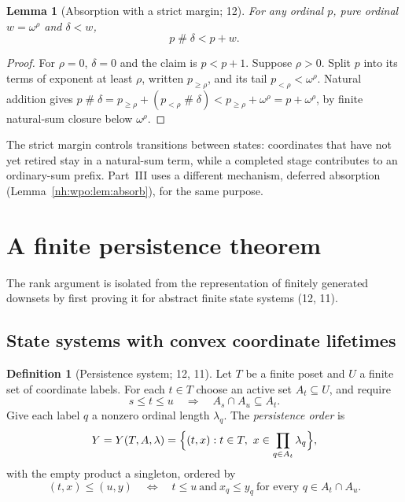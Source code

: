 \documentclass[11pt,a4paper]{article}
\newtheorem{lemma}[theorem]{Lemma}
\theoremstyle{definition}
\newtheorem{definition}[theorem]{Definition}
\theoremstyle{remark}
\newcommand{\ns}{\mathbin{\#}}
\begin{document}
\begin{lemma}[Absorption with a strict margin; 12]\label{nh:lem:absorb}
For any ordinal $p$, pure ordinal $w=\omega^\rho$ and $\delta<w$,
\begin{equation}\label{nh:eq:absorb}
 p\ns\delta<p+w.
\end{equation}
\end{lemma}
\begin{proof}
For $\rho=0$, $\delta=0$ and the claim is $p<p+1$. Suppose $\rho>0$. Split $p$
into its terms of exponent at least $\rho$, written $p_{\ge\rho}$, and its
tail $p_{<\rho}<\omega^\rho$. Natural addition gives
$p\ns\delta=p_{\ge\rho}+(p_{<\rho}\ns\delta)<p_{\ge\rho}+\omega^\rho=p+\omega^\rho$,
by finite natural-sum closure below $\omega^\rho$.
\end{proof}

The strict margin controls transitions between states: coordinates that have
not yet retired stay in a natural-sum term, while a completed stage
contributes to an ordinary-sum prefix. Part~III uses a different mechanism,
deferred absorption (Lemma~\ref{nh:wpo:lem:absorb}), for the same purpose.
\section{A finite persistence theorem}\label{nh:sec:persistence}

The rank argument is isolated from the representation of finitely generated
downsets by first proving it for abstract finite state systems (12, 11).

\subsection{State systems with convex coordinate lifetimes}

\begin{definition}[Persistence system; 12, 11]\label{nh:def:system}
Let $T$ be a finite poset and $U$ a finite set of coordinate labels. For each
$t\in T$ choose an active set $A_t\subseteq U$, and require
\begin{equation}\label{nh:eq:convex}
 s\le t\le u\quad\Longrightarrow\quad A_s\cap A_u\subseteq A_t .
\end{equation}
Give each label $q$ a nonzero ordinal length $\lambda_q$. The
\emph{persistence order} is
\[
 Y=Y(T,A,\lambda)=\Bigl\{(t,x):t\in T,\ x\in\prod_{q\in A_t}\lambda_q\Bigr\},
\]
with the empty product a singleton, ordered by
\begin{equation}\label{nh:eq:stateorder}
 (t,x)\le(u,y)\quad\Longleftrightarrow\quad
 t\le u\ \text{and}\ x_q\le y_q\ \text{for every }q\in A_t\cap A_u .
\end{equation}
\end{definition}
\end{document}

